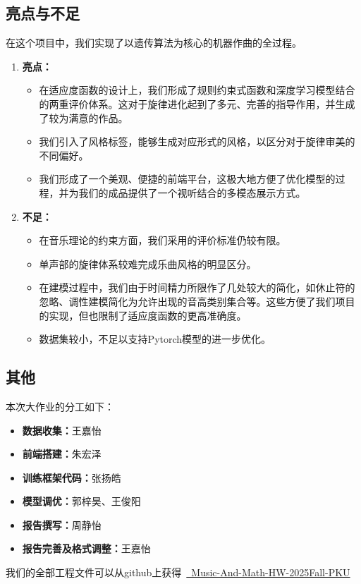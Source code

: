 \documentclass[12pt, a4paper]{ctexart}
\begin{document}
\subsection{亮点与不足}
在这个项目中，我们实现了以遗传算法为核心的机器作曲的全过程。
\begin{enumerate}
    \item \textbf{亮点：}
    \begin{itemize}
        \item 在适应度函数的设计上，我们形成了规则约束式函数和深度学习模型结合的两重评价体系。这对于旋律进化起到了多元、完善的指导作用，并生成了较为满意的作品。
        \item 我们引入了风格标签，能够生成对应形式的风格，以区分对于旋律审美的不同偏好。
        \item 我们形成了一个美观、便捷的前端平台，这极大地方便了优化模型的过程，并为我们的成品提供了一个视听结合的多模态展示方式。
    \end{itemize}
    \item \textbf{不足：} 
    \begin{itemize}
        \item 在音乐理论的约束方面，我们采用的评价标准仍较有限。
        \item 单声部的旋律体系较难完成乐曲风格的明显区分。
        \item 在建模过程中，我们由于时间精力所限作了几处较大的简化，如休止符的忽略、调性建模简化为允许出现的音高类别集合等。这些方便了我们项目的实现，但也限制了适应度函数的更高准确度。
        \item 数据集较小，不足以支持Pytorch模型的进一步优化。
    \end{itemize}
\end{enumerate}

\subsection{其他}
本次大作业的分工如下：
\begin{itemize}
    \item \textbf{数据收集：}王嘉怡
    \item \textbf{前端搭建：}朱宏泽
    \item \textbf{训练框架代码：}张扬皓
    \item \textbf{模型调优：}郭梓昊、王俊阳
    \item \textbf{报告撰写：}周静怡
    \item \textbf{报告完善及格式调整：}王嘉怡
\end{itemize}

我们的全部工程文件可以从github上获得\ \href{https://github.com/elainafan/Music-And-Math-HW-2025Fall-PKU}{\faGithub \ Music-And-Math-HW-2025Fall-PKU}
\end{document}
